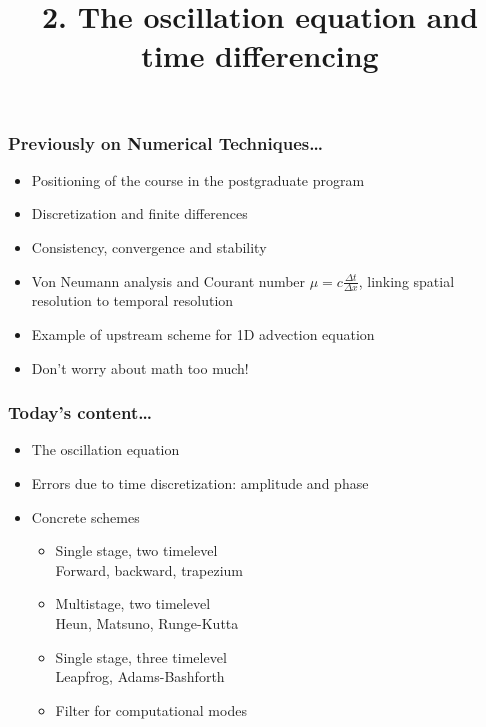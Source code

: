 \documentclass[aspectratio=149,9pt]{beamer}
\title{2. The oscillation equation and time differencing}%
\begin{document}
%
%
\begin{frame}[plain]
	\titlepage
\end{frame}
%
%
\begin{frame}
	\frametitle{Previously on Numerical Techniques\ldots}
	\begin{itemize}
		\item Positioning of the course in the postgraduate program\vspace*{2ex}
		\item Discretization and finite differences\vspace*{2ex}
		\item Consistency, convergence and stability\vspace*{2ex}
		\item Von Neumann analysis and Courant number $\mu=c\frac{\Delta t}{\Delta x}$, linking spatial resolution to temporal resolution\vspace*{2ex}
		\item Example of upstream scheme for 1D advection equation\vspace*{2ex}
		\item Don't worry about math too much!
	\end{itemize}
\end{frame}
%
%
\begin{frame}
	\frametitle{Today's content\ldots}
	\begin{itemize}
		\item The oscillation equation\vspace*{2ex}
		\item Errors due to time discretization: amplitude and phase\vspace*{2ex}
		\item Concrete schemes\vspace*{1ex}
			\begin{itemize}
				\item Single stage, two timelevel\\
					\hspace*{5mm} Forward, backward, trapezium\vspace*{1ex}
				\item Multistage, two timelevel\\
					\hspace*{5mm} Heun, Matsuno, Runge-Kutta\vspace*{1ex}
				\item Single stage, three timelevel\\
					\hspace*{5mm} Leapfrog, Adams-Bashforth\vspace*{1ex}
				\item Filter for computational modes
			\end{itemize}
	\end{itemize}
\end{frame}
\end{document}
